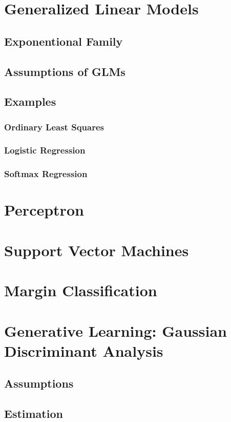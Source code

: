 \documentclass[twoside,twocolumn]{article}
\begin{document}
\section{Generalized Linear Models}
\subsection{Exponentional Family}
\subsection{Assumptions of GLMs}
\subsection{Examples}
\subsubsection{Ordinary Least Squares}
\subsubsection{Logistic Regression}
\subsubsection{Softmax Regression}
\section{Perceptron}
\section{Support Vector Machines}
\section{Margin Classification}
\section{Generative Learning: Gaussian Discriminant Analysis}
\subsection{Assumptions}
\subsection{Estimation}
\end{document}

